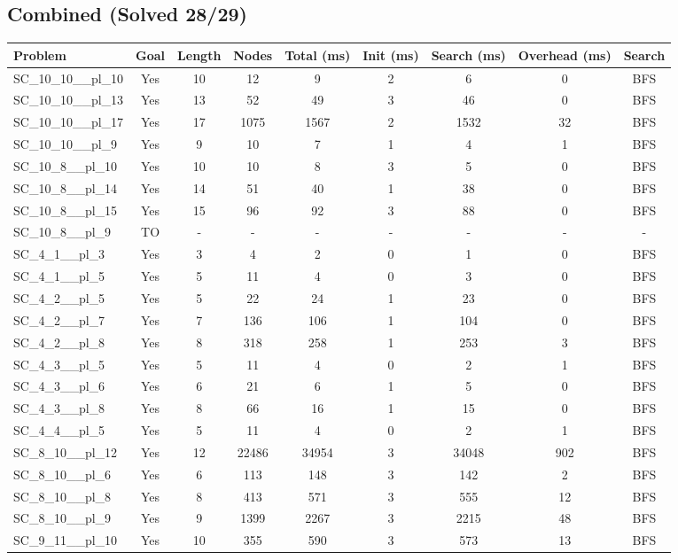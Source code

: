 \documentclass{article}
\begin{document}
\subsection*{Combined (Solved 28/29)}
\begin{tabular}{lcccccccc}
\toprule
Problem & Goal & Length & Nodes & Total (ms) & Init (ms) & Search (ms) & Overhead (ms) & Search \\
\midrule
SC\_10\_10\_\_pl\_10 & Yes & 10 & 12 & 9 & 2 & 6 & 0 & BFS \\
SC\_10\_10\_\_pl\_13 & Yes & 13 & 52 & 49 & 3 & 46 & 0 & BFS \\
SC\_10\_10\_\_pl\_17 & Yes & 17 & 1075 & 1567 & 2 & 1532 & 32 & BFS \\
SC\_10\_10\_\_pl\_9 & Yes & 9 & 10 & 7 & 1 & 4 & 1 & BFS \\
SC\_10\_8\_\_pl\_10 & Yes & 10 & 10 & 8 & 3 & 5 & 0 & BFS \\
SC\_10\_8\_\_pl\_14 & Yes & 14 & 51 & 40 & 1 & 38 & 0 & BFS \\
SC\_10\_8\_\_pl\_15 & Yes & 15 & 96 & 92 & 3 & 88 & 0 & BFS \\
SC\_10\_8\_\_pl\_9 & TO & - & - & - & - & - & - & - \\
SC\_4\_1\_\_pl\_3 & Yes & 3 & 4 & 2 & 0 & 1 & 0 & BFS \\
SC\_4\_1\_\_pl\_5 & Yes & 5 & 11 & 4 & 0 & 3 & 0 & BFS \\
SC\_4\_2\_\_pl\_5 & Yes & 5 & 22 & 24 & 1 & 23 & 0 & BFS \\
SC\_4\_2\_\_pl\_7 & Yes & 7 & 136 & 106 & 1 & 104 & 0 & BFS \\
SC\_4\_2\_\_pl\_8 & Yes & 8 & 318 & 258 & 1 & 253 & 3 & BFS \\
SC\_4\_3\_\_pl\_5 & Yes & 5 & 11 & 4 & 0 & 2 & 1 & BFS \\
SC\_4\_3\_\_pl\_6 & Yes & 6 & 21 & 6 & 1 & 5 & 0 & BFS \\
SC\_4\_3\_\_pl\_8 & Yes & 8 & 66 & 16 & 1 & 15 & 0 & BFS \\
SC\_4\_4\_\_pl\_5 & Yes & 5 & 11 & 4 & 0 & 2 & 1 & BFS \\
SC\_8\_10\_\_pl\_12 & Yes & 12 & 22486 & 34954 & 3 & 34048 & 902 & BFS \\
SC\_8\_10\_\_pl\_6 & Yes & 6 & 113 & 148 & 3 & 142 & 2 & BFS \\
SC\_8\_10\_\_pl\_8 & Yes & 8 & 413 & 571 & 3 & 555 & 12 & BFS \\
SC\_8\_10\_\_pl\_9 & Yes & 9 & 1399 & 2267 & 3 & 2215 & 48 & BFS \\
SC\_9\_11\_\_pl\_10 & Yes & 10 & 355 & 590 & 3 & 573 & 13 & BFS \\

\end{tabular}
\end{document}
